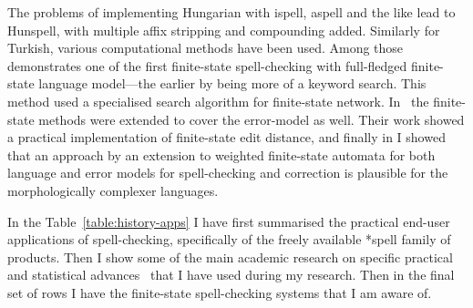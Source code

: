 \documentclass[officiallayout]{unihelcompling}
\begin{document}
The problems of implementing Hungarian with ispell, aspell and the like lead to
Hunspell, with multiple affix stripping and compounding added. Similarly for
Turkish, various computational methods have been used. Among
those~\citet{oflazer1996errortolerant} demonstrates one of the first
finite-state spell-checking with full-fledged finite-state language model---the
earlier by \citep{aho1975efficient} being more of a keyword search. This method
used a specialised search algorithm for finite-state network.
In~\citet{agata2002typographical} the finite-state methods were extended to
cover the error-model as well. Their work showed a practical implementation of
finite-state edit distance, and finally in 
I showed that an approach by an extension to weighted finite-state
automata for both language and error models for spell-checking and correction
is plausible for the morphologically complexer languages.


In the Table~\ref{table:history-apps} I have first summarised the practical
end-user applications of spell-checking, specifically of the freely available
*spell family of products. Then I show some of  the main academic research
on specific practical and statistical advances~\cite{al2006learning} that I
have used during my research. Then in the final set of rows I have the
finite-state spell-checking systems that I am aware of.
\end{document}
